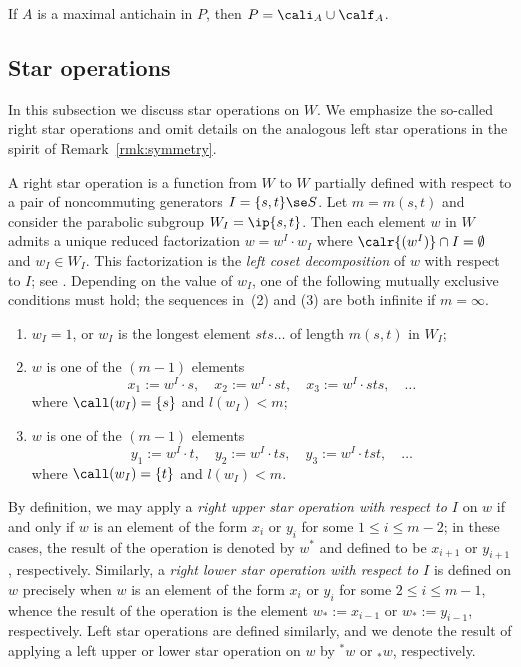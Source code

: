 \begin{lemma}
    \label{lemm:maxAntichain} If $A$ is a maximal antichain in $P$, then $P=\cali_A\cup \calf_A$.
\end{lemma}

\subsection{Star operations} 
\label{sec:StarOperations}

In this subsection we discuss star operations on $W$. We emphasize the so-called right star operations and omit
details on the analogous left star operations in the spirit of Remark~\ref{rmk:symmetry}.  

A right star operation is a function from $W$ to $W$ partially defined with respect to a pair of noncommuting
generators $I=\{s,t\}\se S$. Let $m=m(s,t)$ and consider the parabolic subgroup $W_I=\ip{s,t}$. Then each element
$w$ in $W$ admits a unique reduced factorization $w=w^I \cdot w_I$ where $\calr{(w^I)}\cap I = \emptyset$ and
$w_I\in W_I$.  This factorization is the \emph{left coset decomposition} of $w$ with respect to $I$; see \cite[\S
2.4]{BB}. Depending on the value of $w_I$, one of the following mutually exclusive conditions must hold; the
sequences in~(2) and (3) are both infinite if $m=\infty$.
\begin{enumerate} 
    \item $w_I=1$, or $w_I$ is the longest element $sts\dots$ of length $m(s,t)$ in $W_I$; 
    \item $w$ is one of the $(m-1)$ elements \[ x_1:= w^I\cdot s, \quad x_2:= w^I\cdot st,\quad   x_3:= w^I\cdot
         sts,\quad \dots \] where $\call(w_I)=\{s\}$ and $l(w_I)<m$; 
    \item $w$ is one of the $(m-1)$ elements \[ y_1:= w^I\cdot t,\quad y_2:= w^I\cdot ts,\quad  y_3:= w^I\cdot tst,
         \quad\dots \] where $\call(w_I)=\{t\}$ and $l(w_I)<m$.
\end{enumerate} 

\noindent
By definition, we may apply a \emph{right upper star operation with respect to $I$} on $w$ if and only if $w$ is an
element of the form $x_i$ or $y_i$ for some $1\le i\le m-2$; in these cases, the result of the operation is denoted
by $w^*$ and defined to be $x_{i+1}$ or $y_{i+1}$, respectively. Similarly, a \emph{right lower star operation with
respect to $I$} is defined on $w$ precisely when $w$ is an element of the form $x_i$ or $y_i$ for some $2\le i\le
m-1$, whence the result of the operation is the element $w_*:=x_{i-1}$ or $w_*:=y_{i-1}$, respectively.  Left star
operations are defined similarly, and we denote the result of applying a left upper or lower star operation on $w$
by ${}^* w$ or ${}_* w$, respectively. 

